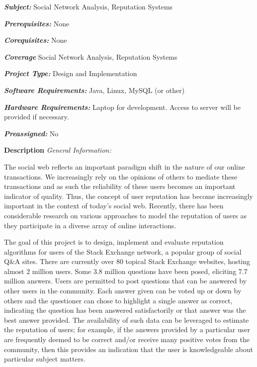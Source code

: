 \documentclass[]{final_report}
\begin{document}
\maketitle
\tableofcontents{}\newpage

\begin{specification}

\textbf{\textsl{Subject:}} Social Network Analysis, Reputation Systems

\textbf{\textsl{Prerequisites:}} None

\textbf{\textsl{Corequisites:}} None

\textbf{\textsl{Coverage}} Social Network Analysis, Reputation Systems

\textbf{\textsl{Project Type:}} Design and Implementation

\textbf{\textsl{Software Requirements:}} Java, Linux, MySQL (or other)

\textbf{\textsl{Hardware Requirements:}} Laptop for development. Access to server will be provided if necessary.

\textbf{\textsl{Preassigned:}} No


\textbf{Description}
\textsl{General Information:}

The social web reflects an important paradigm shift in the nature of our online transactions. We increasingly rely on the opinions of others to mediate these transactions and as such the reliability of these users becomes an important indicator of quality. Thus, the concept of user reputation has become increasingly important in the context of today's social web. Recently, there has been considerable research on various approaches to model the reputation of users as they participate in a diverse array of online interactions.

The goal of this project is to design, implement and evaluate reputation algorithms for users of the Stack Exchange network, a popular group of social Q\&A sites. There are currently over 80 topical Stack Exchange websites, hosting almost 2 million users. Some 3.8 million questions have been posed, eliciting 7.7 million answers. Users are permitted to post questions that can be answered by other users in the community. Each answer given can be voted up or down by others and the questioner can chose to highlight a single answer as correct, indicating the question has been answered satisfactorily or that answer was the best answer provided. The availability of such data can be leveraged to estimate the reputation of users; for example, if the answers provided by a particular user are frequently deemed to be correct and/or receive many positive votes from the community, then this provides an indication that the user is knowledgeable about particular subject matters.


\end{specification}
\end{document}
